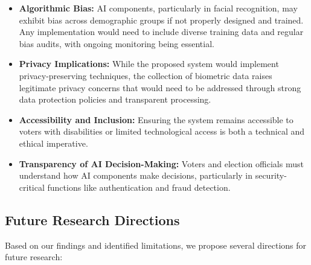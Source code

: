 \documentclass[conference]{IEEEtran}
\begin{document}
\begin{itemize}
    \item \textbf{Algorithmic Bias:} AI components, particularly in facial recognition, may exhibit bias across demographic groups if not properly designed and trained. Any implementation would need to include diverse training data and regular bias audits, with ongoing monitoring being essential.
    
    \item \textbf{Privacy Implications:} While the proposed system would implement privacy-preserving techniques, the collection of biometric data raises legitimate privacy concerns that would need to be addressed through strong data protection policies and transparent processing.
    
    \item \textbf{Accessibility and Inclusion:} Ensuring the system remains accessible to voters with disabilities or limited technological access is both a technical and ethical imperative.
    
    \item \textbf{Transparency of AI Decision-Making:} Voters and election officials must understand how AI components make decisions, particularly in security-critical functions like authentication and fraud detection.
\end{itemize}

\subsection{Future Research Directions}
Based on our findings and identified limitations, we propose several directions for future research:
\end{document}
